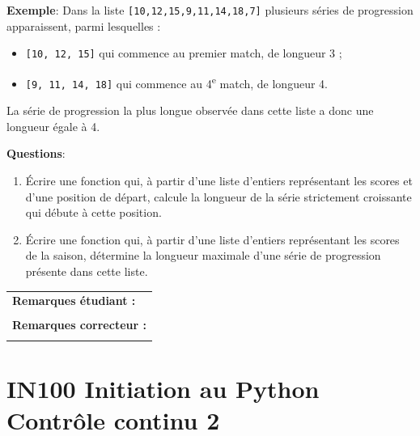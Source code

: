 \documentclass[a4paper,11pt]{article}
\begin{document}
\vspace{0.2 cm}

\textbf{Exemple}:  Dans la liste  \texttt{[10,12,15,9,11,14,18,7]} plusieurs séries de progression apparaissent, parmi lesquelles :
\begin{itemize}
\item \texttt{[10, 12, 15]} qui commence au premier match, de longueur 3 ;
\item \texttt{[9, 11, 14, 18]} qui commence au 4\textsuperscript{e} match, de longueur 4.
\end{itemize}

La série de progression la plus longue observée dans cette liste a donc une longueur égale à 4.

\vspace{0.2 cm}
\textbf{Questions}: 

\begin{enumerate}
\item[1.] Écrire une fonction qui, à partir d’une liste d’entiers représentant les scores et d’une position de départ, calcule la longueur de la série strictement croissante qui débute à cette position.
\item[2.] Écrire une fonction qui, à partir d’une liste d’entiers représentant les scores de la saison, détermine la longueur maximale d’une série de progression présente dans cette liste.
\end{enumerate}


\vspace{-0.4 cm}
\begin{table}[h!]
\centering
\renewcommand{\arraystretch}{1.4} %
\begin{tabular}{|p{15cm}|}
\hline
\textbf{Remarques étudiant :}    \\
 \\
\hline
\textbf{Remarques correcteur :}  \\
 \\
\hline
\end{tabular}
\end{table}

\newpage


\section*{\center IN100 Initiation au Python\\
Contrôle continu 2}

\vspace{-0.3 cm}
\end{document}
